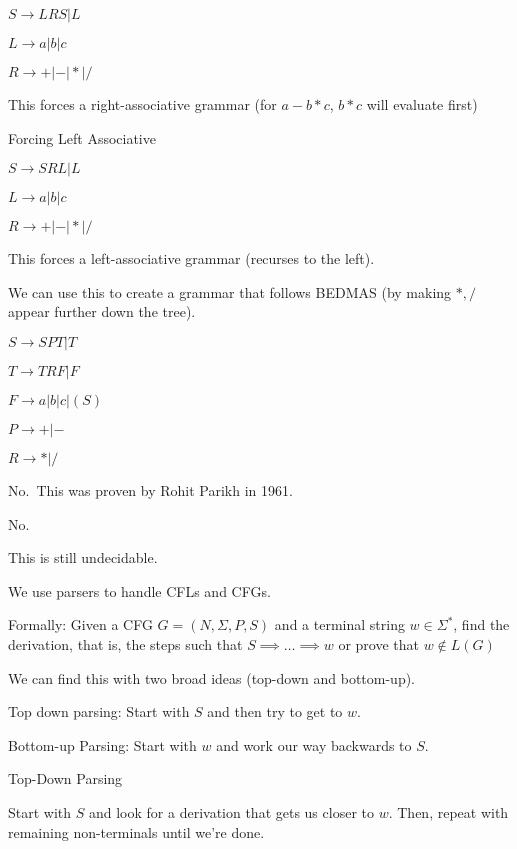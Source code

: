 \documentclass{article}
\begin{document}
\(S \to L R S | L\)

\(L \to a | b | c\)

\(R \to +| - | * | /\)

This forces a right-associative grammar (for \(a - b * c\), \(b * c\)
will evaluate first)

Forcing Left Associative

\(S \to SRL | L\)

\(L \to a | b | c\)

\(R \to + | - | * | /\)

This forces a left-associative grammar (recurses to the left).

We can use this to create a grammar that follows BEDMAS (by making
\(*,/\) appear further down the tree).

\(S \to SPT | T\)

\(T \to TRF | F\)

\(F \to a | b | c | (S)\)

\(P \to + | -\)

\(R \to * | /\)


No.~This was proven by Rohit Parikh in 1961.


No.~


This is still undecidable.

We use parsers to handle CFLs and CFGs.

Formally: Given a CFG \(G = (N, \Sigma, P, S)\) and a terminal string
\(w \in \Sigma^*\), find the derivation, that is, the steps such that
\(S \implies \ldots \implies w\) or prove that \(w \not \in L(G)\)

We can find this with two broad ideas (top-down and bottom-up).

Top down parsing: Start with \(S\) and then try to get to \(w\).

Bottom-up Parsing: Start with \(w\) and work our way backwards to \(S\).

Top-Down Parsing

Start with \(S\) and look for a derivation that gets us closer to \(w\).
Then, repeat with remaining non-terminals until we're done.
\end{document}
